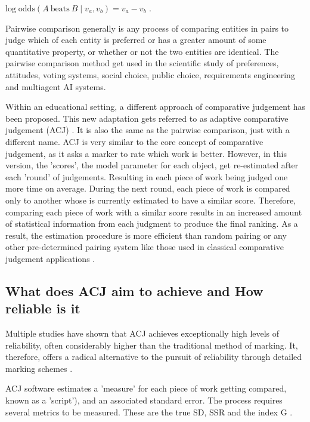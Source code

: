 	\begin{center}
		 
	$\displaystyle \mathrm {log\;odds} (A\ {\text{beats}}\ B\mid v_{a},v_{b})=v_{a}-v_{b}$ .
	
	\end{center}

	Pairwise comparison generally is any process of comparing entities in pairs to judge which of each entity is preferred or has a greater amount of some quantitative property, or whether or not the two entities are identical. The pairwise comparison method get used in the scientific study of preferences, attitudes, voting systems, social choice, public choice, requirements engineering and multiagent AI systems.
	
	Within an educational setting, a different approach of comparative judgement has been proposed. This new adaptation gets referred to as adaptive comparative judgement (ACJ) \cite{pollitt2012method}. It is also the same as the pairwise comparison, just with a different name. ACJ is very similar to the core concept of comparative judgement, as it asks a marker to rate which work is better.  However, in this version, the 'scores', the model parameter for each object, get re-estimated after each 'round' of judgements. Resulting in each piece of work being judged one more time on average. During the next round, each piece of work is compared only to another whose is currently estimated to have a similar score. Therefore, comparing each piece of work with a similar score results in an increased amount of statistical information from each judgment to produce the final ranking. As a result, the estimation procedure is more efficient than random pairing or any other pre-determined pairing system like those used in classical comparative judgement applications \cite{pollitt2012method}.
	
	\subsection{What does ACJ aim to achieve and How reliable is it}
	
	Multiple studies have shown that ACJ achieves exceptionally high levels of reliability, often considerably higher than the traditional method of marking. It, therefore, offers a radical alternative to the pursuit of reliability through detailed marking schemes \cite{pollitt2012method}. 
	
	ACJ software estimates a 'measure' for each piece of work getting compared, known as a 'script'), and an associated standard error. The process requires several metrics to be measured. These are the true SD, SSR and the index G \cite{ bramley2015investigating}.
	
